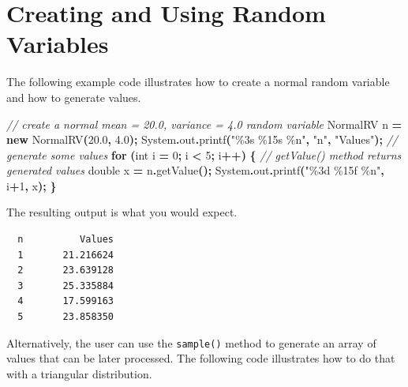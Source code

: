 \documentclass[
]{book}
\newenvironment{Shaded}{\begin{snugshade}}{\end{snugshade}}
\newcommand{\BuiltInTok}[1]{#1}
\newcommand{\CommentTok}[1]{\textcolor[rgb]{0.56,0.35,0.01}{\textit{#1}}}
\newcommand{\ControlFlowTok}[1]{\textcolor[rgb]{0.13,0.29,0.53}{\textbf{#1}}}
\newcommand{\DataTypeTok}[1]{\textcolor[rgb]{0.13,0.29,0.53}{#1}}
\newcommand{\DecValTok}[1]{\textcolor[rgb]{0.00,0.00,0.81}{#1}}
\newcommand{\FloatTok}[1]{\textcolor[rgb]{0.00,0.00,0.81}{#1}}
\newcommand{\FunctionTok}[1]{\textcolor[rgb]{0.00,0.00,0.00}{#1}}
\newcommand{\KeywordTok}[1]{\textcolor[rgb]{0.13,0.29,0.53}{\textbf{#1}}}
\newcommand{\NormalTok}[1]{#1}
\newcommand{\OperatorTok}[1]{\textcolor[rgb]{0.81,0.36,0.00}{\textbf{#1}}}
\newcommand{\SpecialCharTok}[1]{\textcolor[rgb]{0.00,0.00,0.00}{#1}}
\newcommand{\StringTok}[1]{\textcolor[rgb]{0.31,0.60,0.02}{#1}}
\theoremstyle{definition}
\theoremstyle{definition}
\theoremstyle{definition}
\theoremstyle{definition}
\theoremstyle{remark}
\begin{document}
\hypertarget{creating-and-using-random-variables}{%
\section{Creating and Using Random Variables}\label{creating-and-using-random-variables}}

The following example code illustrates how to create a normal random variable and how to generate values.

\begin{Shaded}
\begin{Highlighting}[]
\CommentTok{// create a normal mean = 20.0, variance = 4.0 random variable}
\NormalTok{NormalRV n }\OperatorTok{=} \KeywordTok{new} \FunctionTok{NormalRV}\OperatorTok{(}\FloatTok{20.0}\OperatorTok{,} \FloatTok{4.0}\OperatorTok{);}
\BuiltInTok{System}\OperatorTok{.}\FunctionTok{out}\OperatorTok{.}\FunctionTok{printf}\OperatorTok{(}\StringTok{"}\SpecialCharTok{\%3s}\StringTok{ }\SpecialCharTok{\%15s}\StringTok{ }\SpecialCharTok{\%n}\StringTok{"}\OperatorTok{,} \StringTok{"n"}\OperatorTok{,} \StringTok{"Values"}\OperatorTok{);}
\CommentTok{// generate some values}
\ControlFlowTok{for} \OperatorTok{(}\DataTypeTok{int}\NormalTok{ i }\OperatorTok{=} \DecValTok{0}\OperatorTok{;}\NormalTok{ i }\OperatorTok{\textless{}} \DecValTok{5}\OperatorTok{;}\NormalTok{ i}\OperatorTok{++)} \OperatorTok{\{}
    \CommentTok{// getValue() method returns generated values}
    \DataTypeTok{double}\NormalTok{ x }\OperatorTok{=}\NormalTok{ n}\OperatorTok{.}\FunctionTok{getValue}\OperatorTok{();}
    \BuiltInTok{System}\OperatorTok{.}\FunctionTok{out}\OperatorTok{.}\FunctionTok{printf}\OperatorTok{(}\StringTok{"}\SpecialCharTok{\%3d}\StringTok{ }\SpecialCharTok{\%15f}\StringTok{ }\SpecialCharTok{\%n}\StringTok{"}\OperatorTok{,}\NormalTok{ i}\OperatorTok{+}\DecValTok{1}\OperatorTok{,}\NormalTok{ x}\OperatorTok{);}
\OperatorTok{\}}
\end{Highlighting}
\end{Shaded}

The resulting output is what you would expect.

\begin{verbatim}
  n          Values 
  1       21.216624 
  2       23.639128 
  3       25.335884 
  4       17.599163 
  5       23.858350 
\end{verbatim}

Alternatively, the user can use the \texttt{sample()} method to generate an array of values that can be later processed. The following code illustrates how to do that with a triangular distribution.
\end{document}

